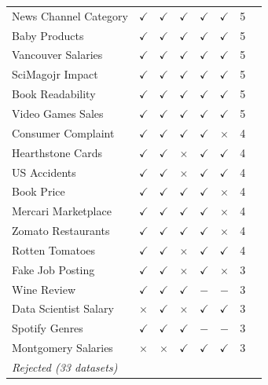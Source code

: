 \documentclass{llmxive}
\begin{document}
\begin{longtable}{llcccccr}
News Channel Category    & $\checkmark$ & $\checkmark$ & $\checkmark$ & $\checkmark$ & $\checkmark$ & 5 \\
Baby Products   & $\checkmark$ & $\checkmark$ & $\checkmark$ & $\checkmark$ & $\checkmark$ & 5 \\
Vancouver Salaries   & $\checkmark$ & $\checkmark$ & $\checkmark$ & $\checkmark$ & $\checkmark$ & 5 \\
SciMagojr Impact  & $\checkmark$ & $\checkmark$ & $\checkmark$ & $\checkmark$ & $\checkmark$ & 5 \\
Book Readability  & $\checkmark$ & $\checkmark$ & $\checkmark$ & $\checkmark$ & $\checkmark$ & 5 \\
Video Games Sales   & $\checkmark$ & $\checkmark$ & $\checkmark$ & $\checkmark$ & $\checkmark$ & 5 \\
Consumer Complaint   & $\checkmark$ & $\checkmark$ & $\checkmark$ & $\checkmark$ & $\times$     & 4 \\
Hearthstone Cards  & $\checkmark$ & $\checkmark$ & $\times$     & $\checkmark$ & $\checkmark$ & 4 \\
US Accidents   & $\checkmark$ & $\checkmark$ & $\times$     & $\checkmark$ & $\checkmark$ & 4 \\
Book Price  & $\checkmark$ & $\checkmark$ & $\checkmark$ & $\checkmark$ & $\times$     & 4 \\
Mercari Marketplace  & $\checkmark$ & $\checkmark$ & $\checkmark$ & $\checkmark$ & $\times$     & 4 \\
Zomato Restaurants   & $\checkmark$ & $\checkmark$ & $\checkmark$ & $\checkmark$ & $\times$     & 4 \\
Rotten Tomatoes   & $\checkmark$ & $\checkmark$ & $\times$     & $\checkmark$ & $\checkmark$ & 4 \\
Fake Job Posting   & $\checkmark$ & $\checkmark$ & $\times$     & $\checkmark$ & $\times$     & 3 \\
Wine Review  & $\checkmark$ & $\checkmark$ & $\checkmark$ & $-$          & $-$          & 3 \\
Data Scientist Salary  & $\times$     & $\checkmark$ & $\times$     & $\checkmark$ & $\checkmark$ & 3 \\
Spotify Genres   & $\checkmark$ & $\checkmark$ & $\checkmark$ & $-$          & $-$          & 3 \\
Montgomery Salaries  & $\times$     & $\times$     & $\checkmark$ & $\checkmark$ & $\checkmark$ & 3 \\
\midrule
\multicolumn{8}{l}{\textit{Rejected (33 datasets)}} \\[2pt]

\end{longtable}
\end{document}
